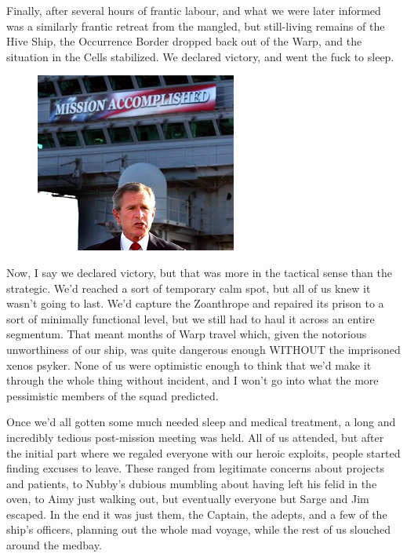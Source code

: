 Finally, after several hours of frantic labour, and what we were later informed was a similarly frantic retreat from the mangled, but still-living remains of the Hive Ship, the Occurrence Border dropped back out of the Warp, and the situation in the Cells stabilized. 
We declared victory, and went the fuck to sleep.
\begin{figure}
	\begin{center}
		\includegraphics[width=\figwidth]{pics/12/76.png}
	\end{center}
\end{figure}
Now, I say we declared victory, but that was more in the tactical sense than the strategic. 
We'd reached a sort of temporary calm spot, but all of us knew it wasn't going to last. 
We'd capture the Zoanthrope and repaired its prison to a sort of minimally functional level, but we still had to haul it across an entire segmentum. 
That meant months of Warp travel which, given the notorious unworthiness of our ship, was quite dangerous enough WITHOUT the imprisoned xenos psyker. 
None of us were optimistic enough to think that we'd make it through the whole thing without incident, and I won't go into what the more pessimistic members of the squad predicted.

Once we'd all gotten some much needed sleep and medical treatment, a long and incredibly tedious post-mission meeting was held. 
All of us attended, but after the initial part where we regaled everyone with our heroic exploits, people started finding excuses to leave. 
These ranged from legitimate concerns about projects and patients, to Nubby's dubious mumbling about having left his felid in the oven, to Aimy just walking out, but eventually everyone but Sarge and Jim escaped. 
In the end it was just them, the Captain, the adepts, and a few of the ship's officers, planning out the whole mad voyage, while the rest of us slouched around the medbay.

